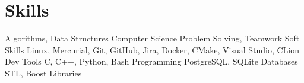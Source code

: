 \section{Skills}

\begin{itemize}
    \cvdoubleitem
        {Algorithms, Data Structures}
        {Computer Science}
    \cvdoubleitem
        {Problem Solving, Teamwork}
        {Soft Skills}
    \cvdoubleitem
        {Linux, Mercurial, Git, GitHub, Jira, Docker, CMake, Visual Studio, CLion}
        {Dev Tools}
    \cvdoubleitem
        {C, C++, Python, Bash}
        {Programming}
    \cvdoubleitem
        {PostgreSQL, SQLite}
        {Databases}
    \cvdoubleitem
        {STL, Boost}
        {Libraries}
\end{itemize}
